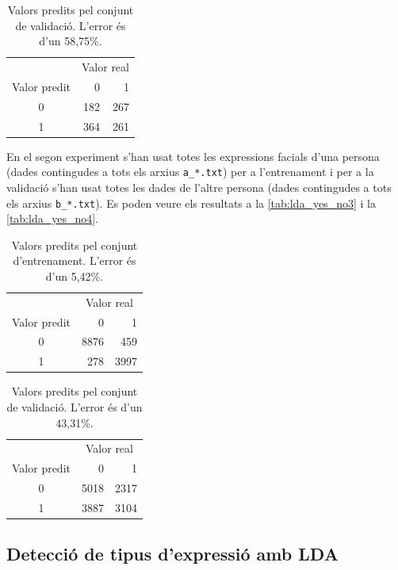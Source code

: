 \documentclass[a4paper]{article}
\begin{document}
\begin{table}[H]
	\centering
	\def\arraystretch{1.5}
	\begin{tabular}{c|rr}
		& \multicolumn{2}{c}{Valor real} \\
		Valor predit & 0 & 1 \\
		\hline
		0 & 182 & 267 \\
		1 & 364 & 261 \\
	\end{tabular}
	\caption{Valors predits pel conjunt de validació. L'error és d'un 58,75\%.}
	\label{tab:lda_yes_no2}
\end{table}

En el segon experiment s'han usat totes les expressions facials d'una persona (dades contingudes a tots els arxius \verb|a_*.txt|) per a l'entrenament i per a la validació s'han usat totes les dades de l'altre persona (dades contingudes a tots els arxius \verb|b_*.txt|). Es poden veure els resultats a la \autoref{tab:lda_yes_no3} i la 	\autoref{tab:lda_yes_no4}.

\begin{table}[H]
	\centering
	\def\arraystretch{1.5}
	\begin{tabular}{c|rr}
		& \multicolumn{2}{c}{Valor real} \\
		Valor predit & 0 & 1 \\
		\hline
		0 & 8876 & 459 \\
		1 & 278 & 3997 \\
	\end{tabular}
	\caption{Valors predits pel conjunt d'entrenament. L'error és d'un 5,42\%.}
	\label{tab:lda_yes_no3}
\end{table}

\begin{table}[H]
	\centering
	\def\arraystretch{1.5}
	\begin{tabular}{c|rr}
		& \multicolumn{2}{c}{Valor real} \\
		Valor predit & 0 & 1 \\
		\hline
		0 & 5018 & 2317 \\
		1 & 3887 & 3104 \\
	\end{tabular}
	\caption{Valors predits pel conjunt de validació. L'error és d'un 43,31\%.}
	\label{tab:lda_yes_no4}
\end{table}

\subsection{Detecció de tipus d'expressió amb LDA}
\end{document}
